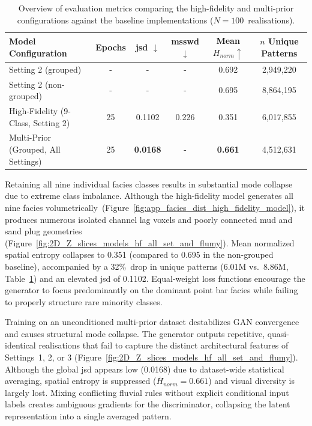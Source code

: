 \begin{table}[htbp!]
    \centering
    \renewcommand{\arraystretch}{1.4}
    \small
    \begin{tabularx}{\textwidth}{Xccccc}
        \hline
        \textbf{Model Configuration} & \textbf{Epochs} & \textbf{\gls{jsd} $\downarrow$} & \textbf{\gls{msswd} $\downarrow$} & \textbf{Mean $H_{norm} \uparrow$} & \textbf{$n$ Unique Patterns} \\
        \hline
        Setting 2 (grouped)     & -  & -      & -       & 0.692 & 2,949,220 \\
        Setting 2 (non-grouped) & -  & -      & -       & 0.695 & 8,864,195 \\
        High-Fidelity (9-Class, Setting 2)  & 25 & 0.1102 & 0.226       & 0.351 & 6,017,855 \\
        Multi-Prior (Grouped, All Settings) & 25 & \textbf{0.0168} & - & \textbf{0.661} & 4,512,631 \\
        \hline
    \end{tabularx}
    \caption{Overview of evaluation metrics comparing the high-fidelity and multi-prior configurations against the baseline implementations ($N = 100$~realisations).}
    \label{tab:high_fidelity_multiprior_comparison}
\end{table}

Retaining all nine individual facies classes results in substantial mode collapse due to extreme class imbalance. Although the high-fidelity model generates all nine facies volumetrically~(Figure~\ref{fig:app_facies_dist_high_fidelity_model}), it produces numerous isolated channel lag voxels and poorly connected mud and sand plug geometries (Figure~\ref{fig:2D_Z_slices_models_hf_all_set_and_flumy}). Mean normalized spatial entropy collapses to 0.351 (compared to 0.695 in the non-grouped baseline), accompanied by a 32\%~drop in unique patterns ($6.01\text{M}$ vs.~$8.86\text{M}$, Table~\ref{tab:high_fidelity_multiprior_comparison}) and an elevated \gls{jsd} of 0.1102. Equal-weight loss functions encourage the generator to focus predominantly on the dominant point bar facies while failing to properly structure rare minority classes.

Training on an unconditioned multi-prior dataset destabilizes GAN convergence and causes structural mode collapse. The generator outputs repetitive, quasi-identical realisations that fail to capture the distinct architectural features of Settings~1, 2, or 3 (Figure~\ref{fig:2D_Z_slices_models_hf_all_set_and_flumy}). Although the global \gls{jsd} appears low (0.0168) due to dataset-wide statistical averaging, spatial entropy is suppressed ($\bar{H}_{norm} = 0.661$) and visual diversity is largely lost. Mixing conflicting fluvial rules without explicit conditional input labels creates ambiguous gradients for the discriminator, collapsing the latent representation into a single averaged pattern.

